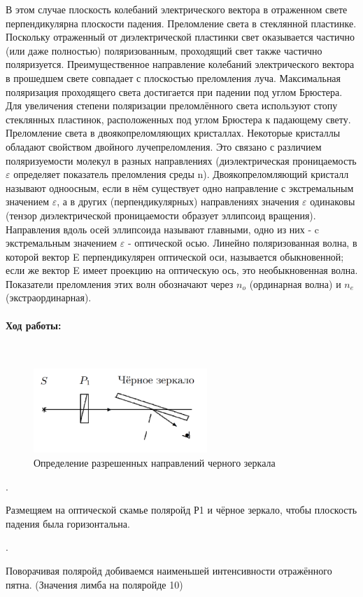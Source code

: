 \documentclass[a4paper, 12pt]{article}
\newcommand{\parag}[1]{\paragraph*{#1:}}
\newcounter{Points}
\newcommand{\point}{\arabic{Points}. \addtocounter{Points}{1}}
\begin{document}
В этом случае плоскость колебаний электрического вектора в отраженном 
свете перпендикулярна плоскости падения. Преломление света в 
стеклянной пластинке. Поскольку отраженный от диэлектрической 
пластинки свет оказывается частично (или даже полностью) 
поляризованным, проходящий свет также частично поляризуется. 
Преимущественное направление колебаний электрического вектора в 
прошедшем свете совпадает с плоскостью преломления луча. Максимальная
поляризация проходящего света достигается при падении под углом 
Брюстера. Для увеличения степени поляризации преломлённого света 
используют стопу стеклянных пластинок, расположенных под углом 
Брюстера к падающему свету. Преломление света в двоякопреломляющих 
кристаллах. Некоторые кристаллы обладают свойством двойного 
лучепреломления. Это связано с различием поляризуемости молекул 
в разных направлениях (диэлектрическая проницаемость $\varepsilon$ 
определяет показатель преломления среды n). Двоякопреломляющий 
кристалл называют одноосным, если в нём существует одно направление 
с экстремальным значением $\varepsilon$, а в других (перпендикулярных) 
направлениях значения $\varepsilon$ одинаковы (тензор диэлектрической 
проницаемости образует эллипсоид вращения). Направления вдоль осей 
эллипсоида называют главными, одно из них - c экстремальным значением 
$\varepsilon$ - оптической осью. Линейно поляризованная волна, в 
которой вектор E перпендикулярен оптической оси, называется 
обыкновенной; если же вектор E имеет проекцию на оптическую ось, это
необыкновенная волна. Показатели преломления этих волн обозначают
через $n_o$ (ординарная волна) и $n_e$ (экстраординарная).

\parag {Ход работы} ~\\

\begin{figure}[h]
    \centering
    \includegraphics[scale=0.7]{pic_1.png}
    \caption{Определение разрешенных направлений черного зеркала}
    \label{img:pic_1}
\end{figure}

\point Размещяем на оптической скамье поляройд Р1 и чёрное зеркало, чтобы
плоскость падения была горизонтальна.

\point Поворачивая поляройд добиваемся наименьшей интенсивности отражённого
пятна. (Значения лимба на поляройде 10)
\end{document}

